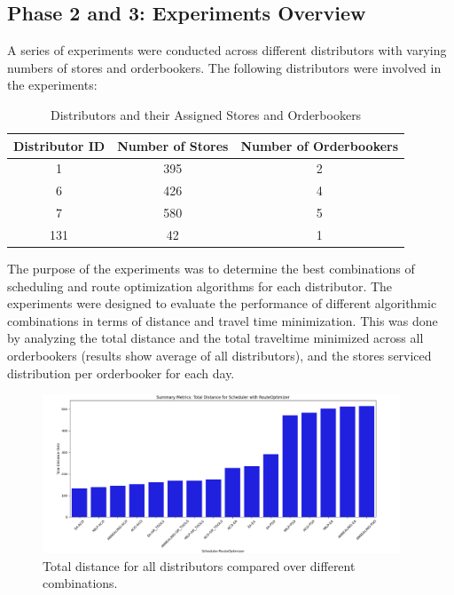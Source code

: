 \subsection{Phase 2 and 3: Experiments Overview}
A series of experiments were conducted across different distributors with varying numbers of stores and orderbookers. The following distributors were involved in the experiments:
\begin{table}[h!]
\centering
\begin{tabular}{|c|c|c|}
\hline
\textbf{Distributor ID} & \textbf{Number of Stores} & \textbf{Number of Orderbookers} \\
\hline
1 & 395 & 2 \\
6 & 426 & 4 \\
7 & 580 & 5 \\
131 & 42 & 1 \\
\hline
\end{tabular}
\caption{Distributors and their Assigned Stores and Orderbookers}
\end{table}

The purpose of the experiments was to determine the best combinations of scheduling and route optimization algorithms for each distributor. The experiments were designed to evaluate the performance of different algorithmic combinations in terms of distance and travel time minimization.
This was done by analyzing the total distance and the total traveltime minimized across all orderbookers (results show average of all distributors), and the stores serviced distribution per orderbooker for each day.

\begin{figure}[H]
    \centering
    \includegraphics[width=0.95\textwidth]{images/results_distance_all_dis}
    \caption{Total distance for all distributors compared over different combinations.}
    \label{fig:results_distance_all_dis}
\end{figure}

